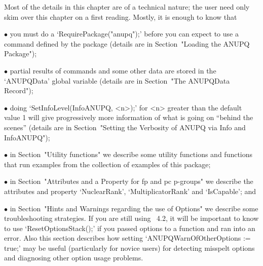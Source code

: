 

Most of the details in this chapter are of a technical nature;  the  user
need only skim over this chapter on a first reading. Mostly, it is enough
to know that

\beginlist%

\item{$\bullet$} 
you must do a `RequirePackage("anupq");' before you can expect to  use  a
command defined by the {\ANUPQ} package (details are in  Section~"Loading
the ANUPQ Package");

\item{$\bullet$}
partial results of {\ANUPQ} commands and some other data  are  stored  in
the `ANUPQData' global variable (details are  in  Section~"The  ANUPQData
Record"); 

\item{$\bullet$} 
doing `SetInfoLevel(InfoANUPQ, <n>);' for <n> greater  than  the  default
value 1 will give progressively more information  of  what  is  going  on
``behind the scenes'' (details are in Section~"Setting the  Verbosity  of
ANUPQ via Info and InfoANUPQ");

\item{$\bullet$} 
in  Section~"Utility functions"  we describe  some utility  functions and
functions  that run  examples from  the  collection of  examples of  this
package;

\item{$\bullet$} 
in Section~"Attributes and a Property for fp and pc p-groups" we describe
the  attributes  and   property  `NuclearRank',  `MultiplicatorRank'  and
`IsCapable'; and

\item{$\bullet$} 
in Section~"Hints and Warnings regarding the use of Options" we  describe
some troubleshooting strategies. If you are still  using  {\GAP}~4.2,  it
will be important to know to use  `ResetOptionsStack();'  if  you  passed
options to a function and ran into an error. Also this section  describes
how  setting   `ANUPQWarnOfOtherOptions   :=   true;'   may   be   useful
(particularly for  novice  users)  for  detecting  misspelt  options  and
diagnosing other option usage problems.

